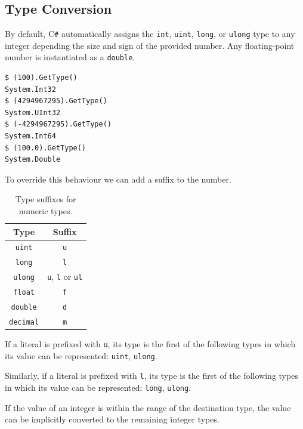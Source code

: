 \documentclass{article}
\begin{document}
\subsection{Type Conversion}
By default, C\texttt{\#} automatically assigns the \lstinline!int!, \lstinline!uint!,
\lstinline!long!, or \lstinline!ulong! type to any integer depending the size and sign
of the provided number. Any floating-point number is instantiated as a \lstinline!double!.
\begin{lstlisting}
$ (100).GetType()
System.Int32
$ (4294967295).GetType()    
System.UInt32
$ (-4294967295).GetType()
System.Int64
$ (100.0).GetType()
System.Double
\end{lstlisting}
To override this behaviour we can add a suffix to the number.
\begin{table}[H]
    \centering
    \begin{tabular}{c c}
        \toprule
        \textbf{Type}       & \textbf{Suffix}                                \\
        \midrule
        \lstinline!uint!    & \lstinline!u!                                  \\
        \lstinline!long!    & \lstinline!l!                                  \\
        \lstinline!ulong!   & \lstinline!u!, \lstinline!l! or \lstinline!ul! \\
        \midrule
        \lstinline!float!   & \lstinline!f!                                  \\
        \lstinline!double!  & \lstinline!d!                                  \\
        \lstinline!decimal! & \lstinline!m!                                  \\
        \bottomrule
    \end{tabular}
    \caption{Type suffixes for numeric types.}
\end{table}
If a literal is prefixed with \lstinline!u!, its type is the first
of the following types in which its value can be represented:
\lstinline!uint!, \lstinline!ulong!.

Similarly, if a literal is prefixed with \lstinline!l!, its type is the first
of the following types in which its value can be represented:
\lstinline!long!, \lstinline!ulong!.

If the value of an integer is within the range of the destination type, 
the value can be implicitly converted to the remaining integer types.
\end{document}
